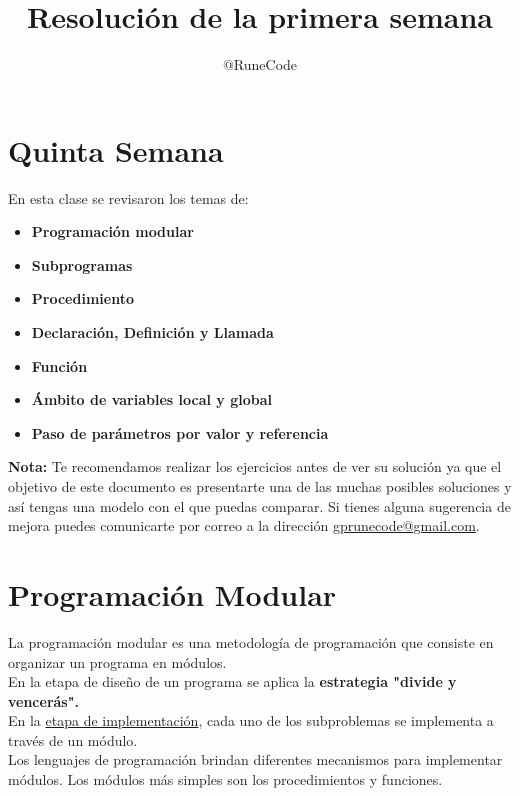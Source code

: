 \documentclass{article}
\title{Resolución de la primera semana}
\author{@RuneCode}
\begin{document}



\section*{Quinta Semana}%
En esta clase se revisaron los temas de:
\begin{itemize}
\item \textbf{Programación modular}
\item \textbf{Subprogramas}
\item \textbf{Procedimiento}
\item \textbf{Declaración, Definición y Llamada}
\item \textbf{Función}
\item \textbf{Ámbito de variables local y global}
\item \textbf{Paso de parámetros por valor y referencia}
\end{itemize}
\vspace{1cm}
\textbf{Nota:} Te recomendamos realizar los ejercicios antes de ver su solución
ya que el objetivo de este documento es presentarte una de las muchas posibles
soluciones y así tengas una modelo con el que puedas comparar. Si tienes alguna
sugerencia de mejora puedes comunicarte por correo a la dirección
\href{mailto:gprunecode@gmail.com}{gprunecode@gmail.com}.

\section{Programación Modular}%
La programación modular es una metodología de programación que consiste en organizar un programa en módulos.\\
En la etapa de diseño de un programa se aplica la \textbf{estrategia "divide y vencerás".}\\
En la \underline{etapa de implementación}, cada uno de los subproblemas se implementa a través de un módulo.\\
Los lenguajes de programación brindan diferentes mecanismos para implementar módulos.
Los módulos más simples son los procedimientos y funciones.\\
\end{document}
